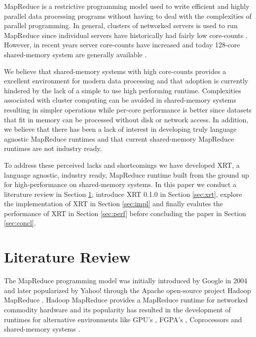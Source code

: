 \documentclass[twocolumn,11px]{article}       %
\begin{document}
MapReduce is a restrictive programming model used to write efficient and highly parallel data processing programs without having to deal with the complexities of parallel programming.
In general, clusters of networked servers is used to run MapReduce since individual servers have historically had fairly low core-counts \cite{GoogleMapReduce} \cite{Hadoop}.
However, in recent years server core-counts have increased and today 128-core shared-memory system are generally available \cite{AWS}.

We believe that shared-memory systems with high core-counts provides a excellent environment for modern data processing and that adoption is currently hindered by the lack of a simple to use high performing runtime.
Complexities associated with cluster computing can be avoided in shared-memory systems resulting in simpler operations while per-core performance is better since datasets that fit in memory can be processed without disk or network access.
In addition, we believe that there has been a lack of interest in developing truly language agnostic MapReduce runtimes and that current shared-memory MapReduce runtimes are not industry ready.

To address these perceived lacks and shortcomings we have developed XRT, a language agnostic, industry ready, MapReduce runtime built from the ground up for high-performance on shared-memory systems.
In this paper we conduct a literature review in Section \ref{sec:litrev}, introduce XRT 0.1.0 in Section \ref{sec:xrt}, explore the implementation of XRT in Section \ref{sec:impl} and finally evalutes the performance of XRT in Section \ref{sec:perf} before concluding the paper in Section \ref{sec:concl}.



\section{Literature Review} \label{sec:litrev}

The MapReduce programming model was initially introduced by Google in 2004 \cite{GoogleMapReduce} and later popularized by Yahoo! through the Apache open-source project Hadoop MapReduce \cite{Hadoop}.
Hadoop MapReduce provides a MapReduce runtime for networked commodity hardware and its popularity has resulted in the development of runtimes for alternative environments like GPU’s \cite{Mars}, FGPA's \cite{Melia}, Coprocessors \cite{MrPhi} and shared-memory systems \cite{Phoenix} \cite{Phoenix++} \cite{CilkMR} \cite{Metis} \cite{Ostrich}.
\end{document}
